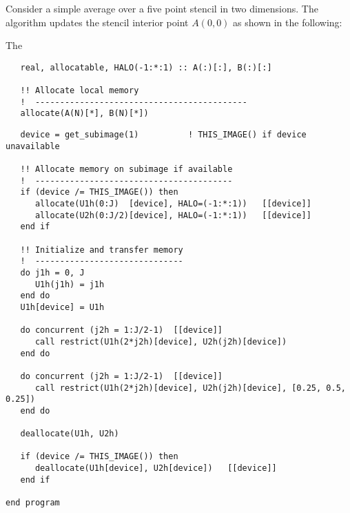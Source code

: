 Consider a simple average over a five point stencil in two dimensions.  The algorithm updates the
stencil interior point $A(0,0)$ as shown in the following:


The 

\begin{verbatim}
   real, allocatable, HALO(-1:*:1) :: A(:)[:], B(:)[:]

   !! Allocate local memory
   !  -------------------------------------------
   allocate(A(N)[*], B(N)[*])
\end{verbatim}

\begin{verbatim}
   device = get_subimage(1)          ! THIS_IMAGE() if device unavailable

   !! Allocate memory on subimage if available
   !  ----------------------------------------
   if (device /= THIS_IMAGE()) then
      allocate(U1h(0:J)  [device], HALO=(-1:*:1))   [[device]]
      allocate(U2h(0:J/2)[device], HALO=(-1:*:1))   [[device]]
   end if

   !! Initialize and transfer memory
   !  ------------------------------
   do j1h = 0, J
      U1h(j1h) = j1h
   end do
   U1h[device] = U1h

   do concurrent (j2h = 1:J/2-1)  [[device]]
      call restrict(U1h(2*j2h)[device], U2h(j2h)[device])
   end do

   do concurrent (j2h = 1:J/2-1)  [[device]]
      call restrict(U1h(2*j2h)[device], U2h(j2h)[device], [0.25, 0.5, 0.25])
   end do

   deallocate(U1h, U2h)

   if (device /= THIS_IMAGE()) then
      deallocate(U1h[device], U2h[device])   [[device]]
   end if
         
end program
\end{verbatim}




